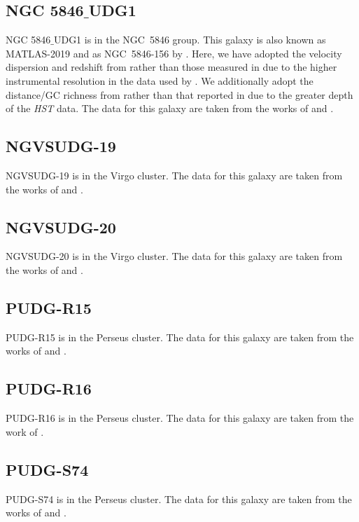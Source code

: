 \subsection{NGC 5846$\_$UDG1}
NGC 5846$\_$UDG1 is in the NGC~5846 group. This galaxy is also known as MATLAS-2019 \citep{Muller2020} and as NGC~5846-156 by \citet{Mahdavi2005}. Here, we have adopted the velocity dispersion and redshift from \cite{Forbes2021} rather than those measured in \cite{Muller2020} due to the higher instrumental resolution in the data used by \citet{Forbes2021}. We additionally adopt the distance/GC richness from \cite{Danieli2022} rather than that reported in \cite{Muller2021} due to the greater depth of the \textit{HST} data. The data for this galaxy are taken from the works of \citet{Forbes2019, Muller2020, Muller2021, Forbes2021, Danieli2022} and \citet{FerreMateu2023}.

\subsection{NGVSUDG-19}
NGVSUDG-19 is in the Virgo cluster. The data for this galaxy are taken from the works of \citet{Lim2020} and \citet{Toloba2023}.

\subsection{NGVSUDG-20}
NGVSUDG-20 is in the Virgo cluster. The data for this galaxy are taken from the works of \citet{Lim2020} and \citet{Toloba2023}.

\subsection{PUDG-R15}
PUDG-R15 is in the Perseus cluster. The data for this galaxy are taken from the works of \citet{Gannon2022, Janssens2024} and \citet{FerreMateu2023}. 

\subsection{PUDG-R16}
PUDG-R16 is in the Perseus cluster. The data for this galaxy are taken from the work of \citet{Gannon2022, Janssens2024}.

\subsection{PUDG-S74}
PUDG-S74 is in the Perseus cluster. The data for this galaxy are taken from the works of \citet{Gannon2022} and \citet{FerreMateu2023}. 

